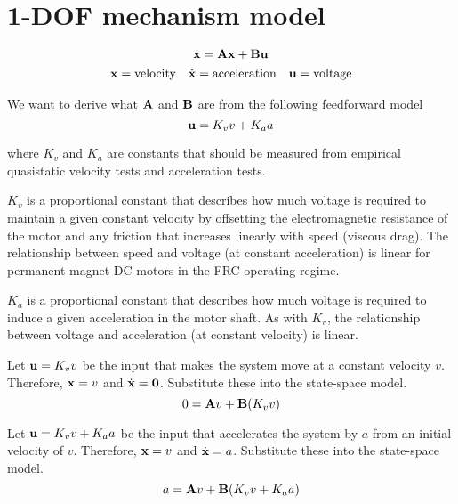 \section{1-DOF mechanism model}
\begin{equation*}
  \dot{\mathbf{x}} = \mathbf{A}\mathbf{x} + \mathbf{B}\mathbf{u}
\end{equation*}
\begin{equation*}
  \begin{array}{ccc}
    \mathbf{x} = \text{velocity} & \dot{\mathbf{x}} = \text{acceleration} &
      \mathbf{u} = \text{voltage}
  \end{array}
\end{equation*}

We want to derive what $\mathbf{A}$ and $\mathbf{B}$ are from the following
feedforward model
\begin{equation*}
  \mathbf{u} = K_v v + K_a a
\end{equation*}

where $K_v$ and $K_a$ are constants that should be measured from empirical
quasistatic velocity tests and acceleration tests.

$K_v$ is a proportional constant that describes how much voltage is required to
maintain a given constant velocity by offsetting the electromagnetic resistance
of the motor and any friction that increases linearly with speed (viscous drag).
The relationship between speed and voltage (at constant acceleration) is linear
for permanent-magnet DC motors in the FRC operating regime.

$K_a$ is a proportional constant that describes how much voltage is required to
induce a given acceleration in the motor shaft. As with $K_v$, the relationship
between voltage and acceleration (at constant velocity) is linear.

Let $\mathbf{u} = K_v v$ be the input that makes the system move at a constant
velocity $v$. Therefore, $\mathbf{x} = v$ and $\dot{\mathbf{x}} = \mathbf{0}$. Substitute
these into the state-space model.
\begin{equation}
  0 = \mathbf{A}v + \mathbf{B}(K_v v) \label{eq:sysid-eq1}
\end{equation}

Let $\mathbf{u} = K_v v + K_a a$ be the input that accelerates the system by $a$
from an initial velocity of $v$. Therefore, $\mathbf{x} = v$ and
$\dot{\mathbf{x}} = a$. Substitute these into the state-space model.
\begin{equation}
  a = \mathbf{A}v + \mathbf{B}(K_v v + K_a a) \label{eq:sysid-eq2}
\end{equation}

